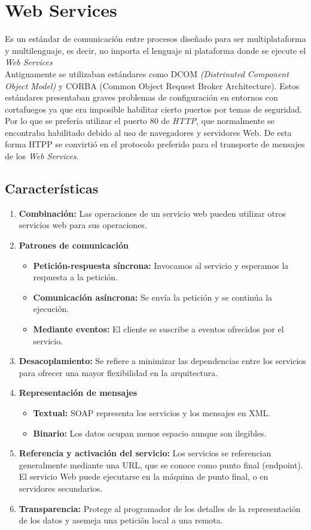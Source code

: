 \section{Web Services}
Es un estándar de comunicación entre procesos diseñado para ser multiplataforma y multilenguaje, es decir, no importa el lenguaje ni plataforma donde se ejecute el \textit{Web Services} \cite{webservices}
\\Antiguamente se utilizaban estándares como DCOM \textit{(Distrinuted Component Object Model)} y CORBA (Common Object Request Broker Architecture). Estos estándares presentaban graves problemas de configuración en entornos con cortafuegos ya que era imposible habilitar cierto puertos por temas de seguridad. Por lo que se prefería utilizar el puerto 80 de \textit{HTTP}, que normalmente se encontraba habilitado debido al uso de navegadores y servidores Web. De esta forma HTPP se convirtió en el protocolo preferido para el transporte de mensajes de los \textit{Web Services}.
\subsection*{Características}
\begin{enumerate}
\item \textbf{Combinación:} Las operaciones de un servicio web pueden utilizar otros servicios web para sus operaciones.
\item \textbf{Patrones de comunicación}
  \begin{itemize}
    \item \textbf{Petición-respuesta síncrona:} Invocamos al servicio y esperamos la respuesta a la petición.
    \item \textbf{Comunicación asíncrona:} Se envía la petición y se continúa la ejecución.
    \item \textbf{Mediante eventos:} El cliente se suscribe a eventos ofrecidos por el servicio.
  \end{itemize}
\item \textbf{Desacoplamiento:} Se refiere a minimizar las dependencias entre los servicios para ofrecer una mayor flexibilidad en la arquitectura.
\item \textbf{Representación de mensajes}
  \begin{itemize}
    \item \textbf{Textual:} SOAP representa los servicios y los mensajes en XML.
    \item \textbf{Binario:} Los datos ocupan menos espacio aunque son ilegibles.
  \end{itemize}
\item \textbf{Referencia y activación del servicio:} Los servicios se referencian generalmente mediante una URL, que se conoce como punto final (endpoint). El servicio Web puede ejecutarse en la máquina de punto final, o en servidores secundarios.
\item \textbf{Transparencia:} Protege al programador de los detalles de la representación
de los datos y asemeja una petición local a una remota.
\end{enumerate}

